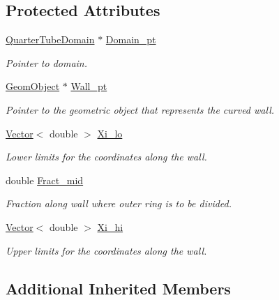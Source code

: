\subsection*{Protected Attributes}
\begin{DoxyCompactItemize}
\item 
\hyperlink{classoomph_1_1QuarterTubeDomain}{Quarter\+Tube\+Domain} $\ast$ \hyperlink{classoomph_1_1QuarterTubeMesh_a250577dc1d699b4035a42ddabd84c121}{Domain\+\_\+pt}
\begin{DoxyCompactList}\small\item\em Pointer to domain. \end{DoxyCompactList}\item 
\hyperlink{classoomph_1_1GeomObject}{Geom\+Object} $\ast$ \hyperlink{classoomph_1_1QuarterTubeMesh_a961bf18652514913c6a63c4850088e8b}{Wall\+\_\+pt}
\begin{DoxyCompactList}\small\item\em Pointer to the geometric object that represents the curved wall. \end{DoxyCompactList}\item 
\hyperlink{classoomph_1_1Vector}{Vector}$<$ double $>$ \hyperlink{classoomph_1_1QuarterTubeMesh_a323243990ecc860e5083d205c1ab247c}{Xi\+\_\+lo}
\begin{DoxyCompactList}\small\item\em Lower limits for the coordinates along the wall. \end{DoxyCompactList}\item 
double \hyperlink{classoomph_1_1QuarterTubeMesh_ac7422bd566e566fd901bbbc98d8cb3b7}{Fract\+\_\+mid}
\begin{DoxyCompactList}\small\item\em Fraction along wall where outer ring is to be divided. \end{DoxyCompactList}\item 
\hyperlink{classoomph_1_1Vector}{Vector}$<$ double $>$ \hyperlink{classoomph_1_1QuarterTubeMesh_aabb226a0b0208c579f426e58d944685c}{Xi\+\_\+hi}
\begin{DoxyCompactList}\small\item\em Upper limits for the coordinates along the wall. \end{DoxyCompactList}\end{DoxyCompactItemize}
\subsection*{Additional Inherited Members}


